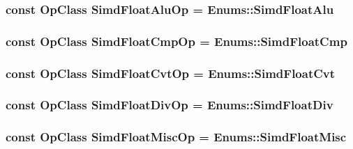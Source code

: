 \label{op__class_8hh_af5d28e472a47193ce4cfab8dd3938d7a}
\hypertarget{op__class_8hh_a8ca7b859c7e65be5c76e5e4266cce355}{
\subsubsection[{SimdFloatAluOp}]{\setlength{\rightskip}{0pt plus 5cm}const OpClass {\bf SimdFloatAluOp} = Enums::SimdFloatAlu}}
\label{op__class_8hh_a8ca7b859c7e65be5c76e5e4266cce355}
\hypertarget{op__class_8hh_afddfea9d9ae86b65f397398048b36c87}{
\subsubsection[{SimdFloatCmpOp}]{\setlength{\rightskip}{0pt plus 5cm}const OpClass {\bf SimdFloatCmpOp} = Enums::SimdFloatCmp}}
\label{op__class_8hh_afddfea9d9ae86b65f397398048b36c87}
\hypertarget{op__class_8hh_a8da273cd0cba9df164b189dc216b1d50}{
\subsubsection[{SimdFloatCvtOp}]{\setlength{\rightskip}{0pt plus 5cm}const OpClass {\bf SimdFloatCvtOp} = Enums::SimdFloatCvt}}
\label{op__class_8hh_a8da273cd0cba9df164b189dc216b1d50}
\hypertarget{op__class_8hh_a3b9f6c8547a6db26f930c8ccbc6090c8}{
\subsubsection[{SimdFloatDivOp}]{\setlength{\rightskip}{0pt plus 5cm}const OpClass {\bf SimdFloatDivOp} = Enums::SimdFloatDiv}}
\label{op__class_8hh_a3b9f6c8547a6db26f930c8ccbc6090c8}
\hypertarget{op__class_8hh_ab275354d1f1f0f4fef21d3b14eeaed98}{
\subsubsection[{SimdFloatMiscOp}]{\setlength{\rightskip}{0pt plus 5cm}const OpClass {\bf SimdFloatMiscOp} = Enums::SimdFloatMisc}}

